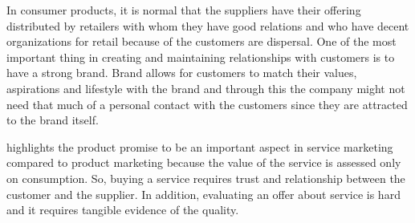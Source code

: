 In consumer products, it is normal that the suppliers have their offering distributed by retailers with whom they have good relations and who have decent organizations for retail because of the customers are dispersal. One of the most important thing in creating and maintaining relationships with customers is to have a strong brand. Brand allows for customers to match their values, aspirations and lifestyle with the brand and through this the company might not need that much of a personal contact with the customers since they are attracted to the brand itself. \parencite{MarketingPlans:2016}

\textcite{MarketingPlans:2016} highlights the product promise to be an important aspect in service marketing compared to product marketing because the value of the service is assessed only on consumption. So, buying a service requires trust and relationship between the customer and the supplier. In addition, evaluating an offer about service is hard and it requires tangible evidence of the quality.






